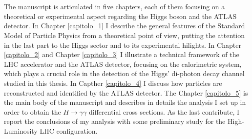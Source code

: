 \\\\
The manuscript is articulated in five chapters, each of them focusing on a theoretical or experimental aspect regarding the Higgs boson and the ATLAS detector. In Chapter \ref{capitolo_1} I describe the general features of the Standard Model of Particle Physics from a theoretical point of view, putting the attention in the last part to the Higgs sector and to its experimental hilights. In Chapter \ref{capitolo_2} and Chapter \ref{capitolo_3} I illustrate a technical framework of the LHC accelerator and the ATLAS detector, focusing on the calorimetric system, which plays a crucial role in the detection of the Higgs' di-photon decay channel studied in this thesis. In Capther \ref{capitolo_4} I discuss how particles are reconstructed and identified by the ATLAS detector. The Chapter \ref{capitolo_5} is the main body of the manuscript and describes in details the analysis I set up in order to obtain the $H \rightarrow \gamma\gamma$ differential cross sections. As the last contribute, I report the conclusions of my analysis with some preliminary study for the High-Luminosity LHC configuration.
